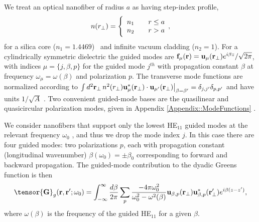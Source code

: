 \documentclass[preprint, aps,pra,onecolumn]{revtex4-1} %
\begin{document}
We treat an optical nanofiber of radius $a$ as having step-index profile,
	\begin{align} \label{Eq::IndexofRefraction}
		n(r_\perp) = \Bigg\{  
			\begin{array}{l l} n_1 & \quad r \leq a \\
						 n_2 & \quad r > a 
		\end{array},
	\end{align}
for a silica core ($n_1 = 1.4469$)~\cite{kien_field_2004} and infinite vacuum cladding ($n_2 = 1$).  For a cylindrically symmetric dielectric the guided modes are {\color{blue}  $\mathbf{f}_\mu (\mathbf{r}) = \mathbf{u}_\mu (\mathbf{r}_\perp) e^{i\beta z}/\sqrt{2 \pi}$}, with indices $\mu=\{j, \beta , p\}$ for the guided mode $j^{th}$ with propagation constant $\beta$ {\color{blue} at frequency $\omega_\mu=\omega(\beta)$} and polarization $p$.  The transverse mode functions are normalized according to $\int d^2 \mathbf{r}_\perp \, n^2(r_\perp)\mathbf{u}^*_\mu (\mathbf{r}_\perp) \cdot \mathbf{u}_{\mu'} (\mathbf{r}_\perp)\big|_{\beta = \beta'} = \delta_{j,j'}\delta_{p,p'}$ and have units $1/\sqrt{A}$ \cite{le_kien_anisotropy_2014}.  Two convenient guided-mode bases are the quasilinear and quasicircular polarization modes, given in  Appendix \ref{Appendix::ModeFunctions} \cite{kien_field_2004}.  

We consider nanofibers that support only the lowest HE$_{11}$ guided modes at the relevant frequency $\omega_0$ \cite{snyder_optical_1983}, and thus we drop the mode index $j$.  In this case there are four guided modes: two polarizations $p$, each with propagation constant (longitudinal wavenumber) $\beta(\omega_0) = \pm\beta_0$ corresponding to forward and backward propagation.  The guided-mode contribution to the dyadic Greens function is then 
	\begin{equation} \label{Eq::GreensEigenmodes}
		\tensor{\mathbf{G}}_g(\br,\br'; \omega_0) = \int_{-\infty}^\infty \frac{d \beta}{2 \pi} \sum_{p} 
\frac{-4\pi\omega_0^2}{\omega_0^2-\omega^2(\beta)} \mathbf{u}_{\beta,p} (\br_\perp)\mathbf{u}^*_{\beta,p} 
(\br_{\perp}^\prime) e^{i\beta(z-z')},
	\end{equation}
where $ \omega(\beta)$ is the frequency of the guided HE$_{11}$ for a given $\beta$.  
\end{document}
